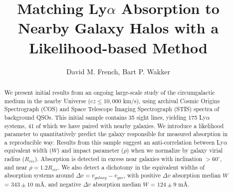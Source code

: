 \documentclass[iop]{emulateapj-rtx4}
\begin{document}

\title{Matching Ly$\alpha$ Absorption to Nearby Galaxy Halos with a Likelihood-based Method}

\author{David M. French, Bart P. Wakker}



\begin{abstract}

We present initial results from an ongoing large-scale study of the circumgalactic medium in the nearby Universe ($cz \leq 10,000$ km/s), using archival Cosmic Origins Spectrograph (COS) and Space Telescope Imaging Spectrograph (STIS) spectra of background QSOs. This initial sample contains 35 sight lines, yielding 175 Ly$\alpha$ systems, 41 of which we have paired with nearby galaxies. We introduce a likelihood parameter to quantitatively predict the galaxy responsible for measured absorption in a reproducible way. Results from this sample suggest an anti-correlation between Ly$\alpha$ equivalent width ($W$) and impact parameter ($\rho$) when we normalize by galaxy virial radius ($R_{vir}$). Absorption is detected in excess near galaxies with inclination $>60^\circ$, and near $\rho= 1.2 R_{vir}$. We also detect a dichotomy in the equivalent widths of absorption systems around $\Delta v = v_{galaxy} - v_{gas}$, with positive $\Delta v$ absorption median $W$ = $343 \pm 10$ m\AA, and negative $\Delta v$  absorption median $W$ = $124 \pm 9$ m\AA. 




\end{abstract}
\end{document}
